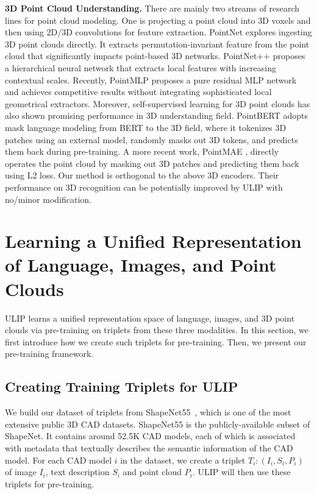 \noindent\textbf{3D Point Cloud Understanding.}
There are mainly two streams of research lines for point cloud modeling. One is projecting a point cloud into 3D voxels \cite{maturana2015voxnet,shi2020pv} and then using 2D/3D convolutions for feature extraction. PointNet \cite{qi2017pointnet} explores ingesting 3D point clouds directly. It extracts permutation-invariant feature from the point cloud that significantly impacts point-based 3D networks. PointNet++ \cite{qi2017pointnet++} proposes a hierarchical neural network that extracts local features with increasing contextual scales. Recently, PointMLP \cite{ma2022rethinking} proposes a pure residual MLP network and achieves competitive results without integrating sophisticated local geometrical extractors. 
Moreover, self-supervised learning for 3D point clouds has also shown promising performance in 3D understanding field. PointBERT \cite{yu2022point} adopts mask language modeling from BERT \cite{devlin2018bert} to the 3D field, where it tokenizes 3D patches using an external model, randomly masks out 3D tokens, and predicts them back during pre-training. A more recent work, PointMAE \cite{pang2022masked}, directly operates the point cloud by masking out 3D patches and predicting them back using L2 loss. Our method is orthogonal to the above 3D encoders. Their performance on 3D recognition can be potentially improved by ULIP with no/minor modification.

\section{Learning a Unified Representation of Language,
Images, and Point Clouds}
\label{sec:method}

ULIP learns a unified representation space of language, images, and 3D point clouds via pre-training on triplets from these three modalities. 
In this section, we first introduce how we create such triplets for pre-training. Then, we present our pre-training framework.

\subsection{Creating Training Triplets for ULIP}
\label{sec:create triplet}

We build our dataset of triplets from ShapeNet55~\cite{chang2015shapenet}, which is one of the most extensive public 3D CAD datasets. 
ShapeNet55 is the publicly-available subset of ShapeNet. 
It contains around 52.5K CAD models, each of which is associated with metadata that textually describes the semantic information of the CAD model. 
For each CAD model $i$ in the dataset, we create a triplet $T_i:(I_i, S_i, P_i)$ of image $I_i$, text description $S_i$ and point cloud $P_i$. ULIP will then use these triplets for pre-training. 

